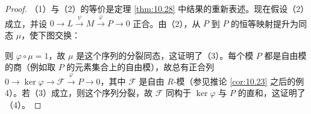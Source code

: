 \begin{proof}
（1）与（2）的等价是定理 \ref{thm:10.28} 中结果的重新表述。现在假设（2）成立，并设 \(0 \to L \xrightarrow{\psi} M \xrightarrow{\varphi} P \to 0\) 正合。由（2），从 \(P\) 到 \(P\) 的恒等映射提升为同态 \(\mu\)，使下图交换：
\begin{center}\end{center}
则 \(\varphi \circ \mu = 1\)，故 \(\mu\) 是这个序列的分裂同态，这证明了（3）。每个模 \(P\) 都是自由模的商（例如取 \(P\) 的元素集合上的自由模），故总有正合列 \(0 \to \ker\varphi \to \mathcal{F} \xrightarrow{\varphi} P \to 0\)，其中 \(\mathcal{F}\) 是自由 \(R\)-模（参见推论 \ref{cor:10.23} 之后的例 4）。若（3）成立，则这个序列分裂，故 \(\mathcal{F}\) 同构于 \(\ker\varphi\) 与 \(P\) 的直和，这证明了（4）。


\end{proof}
